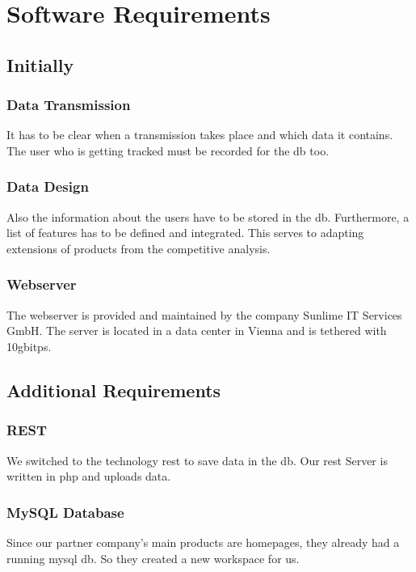 \chapter{Software Requirements}
\section{Initially}
\subsection{Data Transmission}
It has to be clear when a transmission takes place and which data it contains. The user who is getting tracked must be recorded for the \gls{db} too.
\subsection{Data Design}
Also the information about the users have to be stored in the \gls{db}. Furthermore, a list of features has to be defined and integrated. This serves to adapting extensions of products from the competitive analysis.
\subsection{Webserver}
The webserver is provided and maintained by the company Sunlime IT Services GmbH. The server is located in a data center in Vienna and is tethered with 10\gls{gbitps}.
\section{Additional Requirements}
\subsection{REST}
We switched to the technology \gls{rest} to save data in the \gls{db}. Our \gls{rest} Server is written in \gls{php} and uploads data.
\subsection{MySQL Database}
Since our partner company's main products are homepages, they already had a running \gls{mysql} \gls{db}. So they created a new workspace for us.
\clearpageauthor


